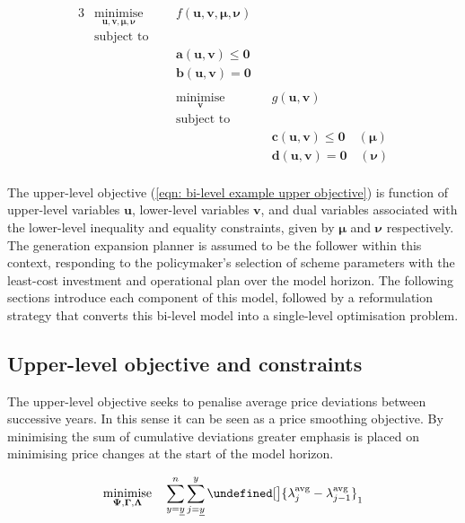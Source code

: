 \documentclass{article}
\let\norm\undefined %
\DeclarePairedDelimiter\norm{\lVert}{\rVert}
\DeclareMathOperator*{\minimise}{minimise}
\begin{document}
\begin{alignat}{3}
& \minimise\limits_{\bm{u}, \bm{v}, \bm{\mu}, \bm{\nu}} \quad && f\left(\bm{u}, \bm{v}, \bm{\mu}, \bm{\nu}\right) \label{eqn: bi-level example upper objective}\\
& \textrm{subject to} \nonumber\\
& && \bm{a}(\bm{u}, \bm{v}) \leq \bm{0}\\
& && \bm{b}(\bm{u}, \bm{v}) = \bm{0}\\
&\nonumber \\
& && \minimise\limits_{\bm{v}} \quad && g(\bm{u}, \bm{v})\\
& && \textrm{subject to} \nonumber\\
& && && \bm{c}(\bm{u}, \bm{v}) \leq \bm{0} \quad \left(\bm{\mu}\right) \\
& && && \bm{d}(\bm{u}, \bm{v}) = \bm{0} \quad \left(\bm{\nu}\right) \label{eqn: bi-level example lower-level equality constraint}\\\nonumber
\end{alignat}

The upper-level objective (\ref{eqn: bi-level example upper objective}) is function of upper-level variables $\bm{u}$, lower-level variables $\bm{v}$, and dual variables associated with the lower-level inequality and equality constraints, given by $\bm{\mu}$ and $\bm{\nu}$ respectively. The generation expansion planner is assumed to be the follower within this context, responding to the policymaker's selection of scheme parameters with the least-cost investment and operational plan over the model horizon. The following sections introduce each component of this model, followed by a reformulation strategy that converts this bi-level model into a single-level optimisation problem.

\subsection{Upper-level objective and constraints}
The upper-level objective seeks to penalise average price deviations between successive years. In this sense it can be seen as a price smoothing objective. By minimising the sum of cumulative deviations greater emphasis is placed on minimising price changes at the start of the model horizon.

\begin{equation}
	\minimise\limits_{\bm{\Psi}, \bm{\Gamma}, \bm{\Lambda}} \quad \sum\limits_{\iYear=\iYearStart}^{\iYearTransition} \sum\limits_{\iYearAlias=\iYearStart}^{\iYear} \norm[\big]{\dAveragePrice[\iYearAlias] - \dAveragePrice[\iYearAlias-1]}_{1}
	\label{eqn: upper-level objective}
\end{equation}
\end{document}
